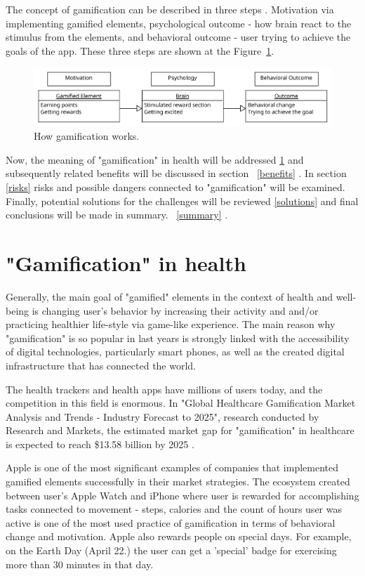 \documentclass[10pt,twoside,english,a4paper]{article}
\begin{document}
The concept of gamification can be described in three steps \cite{6758978}. Motivation via implementing gamified elements, psychological outcome - how brain react to the stimulus from the elements, and behavioral outcome - user trying to achieve the goals of the app. These three steps are shown at the Figure~\ref{f:figure1}.

\begin{figure}[tbh]
\centering
\includegraphics[width=1.0\linewidth]{Figure1.pdf}
\caption{How gamification works.}
\label{f:figure1}
\end{figure}


Now, the meaning of "gamification" in health will be addressed \ref{G-i-H} and subsequently related benefits will be discussed in section ~\ref{benefits} . In section \ref{risks} risks and possible dangers connected to "gamification" will be examined. Finally, potential solutions for the challenges will be reviewed \ref{solutions} and final conclusions will be made  in summary. ~\ref{summary} .

%
%
%

\section{"Gamification" in health} \label{G-i-H}
Generally, the main goal of "gamified" elements in the context of health and well-being is changing user's behavior by increasing their activity and and/or practicing healthier life-style via game-like experience. The main reason why "gamification" is so popular in last years is strongly linked with the accessibility of digital technologies, particularly smart phones, as well as the created digital infrastructure\cite{Ethics} that has connected the world. 

The health trackers and health apps have millions of users today, and the competition in this field is enormous. In "Global Healthcare Gamification Market Analysis and Trends - Industry Forecast to 2025", research conducted by Research and Markets, the estimated market gap for "gamification" in healthcare is expected to reach \$13.58 billion by 2025 \cite{mgap} .  

Apple is one of the most significant examples of companies that implemented gamified elements successfully in their market strategies. The ecosystem created between user's Apple Watch and iPhone where user is rewarded for accomplishing tasks connected to movement - steps, calories and the count of hours user was active is one of the most used practice \cite{aboveAvalon} of gamification in terms of behavioral change and motivation.  Apple also rewards people on special days. For example, on the Earth Day (April 22.) the user can get a 'special' badge for exercising more than 30 minutes in that day\cite{earthDay}. 
\end{document}
